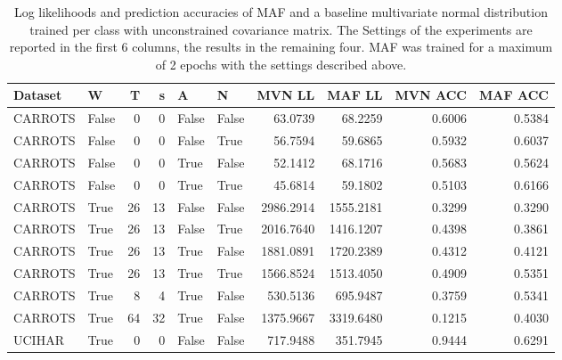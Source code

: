 \documentclass[11pt,titlepage,oneside,openany]{book}
\begin{document}
\begin{table}
\tiny
\begin{tabularx}{\textwidth}{llrrllrrrr}
	\toprule
	Dataset &  W &  T &  s &  A &  N &    MVN LL &    MAF LL &  MVN ACC &  MAF ACC \\
	\midrule
	CARROTS &   False &       0 &       0 &    False &  False &   63.0739 &   68.2259 &   0.6006 &   0.5384 \\
	CARROTS &   False &       0 &       0 &    False &   True &   56.7594 &   59.6865 &   0.5932 &   0.6037 \\
	CARROTS &   False &       0 &       0 &     True &  False &   52.1412 &   68.1716 &   0.5683 &   0.5624 \\
	CARROTS &   False &       0 &       0 &     True &   True &   45.6814 &   59.1802 &   0.5103 &   0.6166 \\
	CARROTS &    True &      26 &      13 &    False &  False & 2986.2914 & 1555.2181 &   0.3299 &   0.3290 \\
	CARROTS &    True &      26 &      13 &    False &   True & 2016.7640 & 1416.1207 &   0.4398 &   0.3861 \\
	CARROTS &    True &      26 &      13 &     True &  False & 1881.0891 & 1720.2389 &   0.4312 &   0.4121 \\
	CARROTS &    True &      26 &      13 &     True &   True & 1566.8524 & 1513.4050 &   0.4909 &   0.5351 \\
	CARROTS &    True &       8 &       4 &     True &  False &  530.5136 &  695.9487 &   0.3759 &   0.5341 \\
	CARROTS &    True &      64 &      32 &     True &  False & 1375.9667 & 3319.6480 &   0.1215 &   0.4030 \\
	UCIHAR &    True &       0 &       0 &    False &  False &  717.9488 &  351.7945 &   0.9444 &   0.6291 \\
	\bottomrule
\end{tabularx}
\caption[Evaluation Results Carrots]{\label{tab:2eps} Log likelihoods and prediction accuracies of MAF and a baseline multivariate normal distribution trained per class with unconstrained covariance matrix. The Settings of the experiments are reported in the first 6 columns, the results in the remaining four. MAF was trained for a maximum of 2 epochs with the settings described above.}
\end{table}
\end{document}
